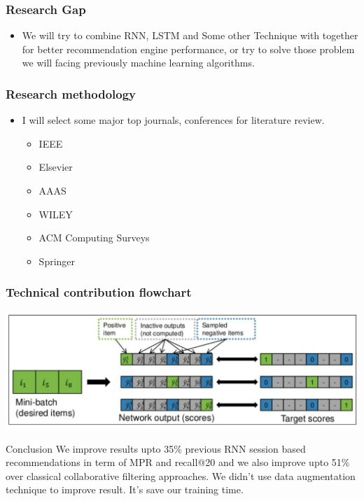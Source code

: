 \documentclass{beamer}
\begin{document}
\begin{frame}
\frametitle{Research Gap}
\begin{minipage}{\textwidth}
	\begin{itemize}
    	\item We will try to combine RNN, LSTM and Some other Technique with together for better recommendation engine performance, or try to solve those problem we will facing previously machine learning algorithms.

	\end{itemize}
\end{minipage}
\end{frame} 

\begin{frame}
\frametitle{Research methodology }
	\begin{itemize}
    	\item I will select some major top journals, conferences for literature review.
    	
    	\begin{itemize}
    	    \item IEEE
    	    \item Elsevier
    	    \item AAAS
    	    \item WILEY
    	    \item ACM Computing Surveys
    	    \item Springer

    	\end{itemize}
    \end{itemize}
    
    
\end{frame} 





\begin{frame}
\frametitle{Technical contribution flowchart}
\includegraphics[width=\textwidth]{technical.JPG}	 
\end{frame} 

\begin{frame}{Conclusion}
    We improve results upto 35\% previous RNN session based recommendations in term of MPR and recall@20 and we also improve upto 51\% over classical collaborative filtering approaches. We didn’t use data augmentation technique to improve result. It’s save our training time.

\end{frame}
\end{document}

